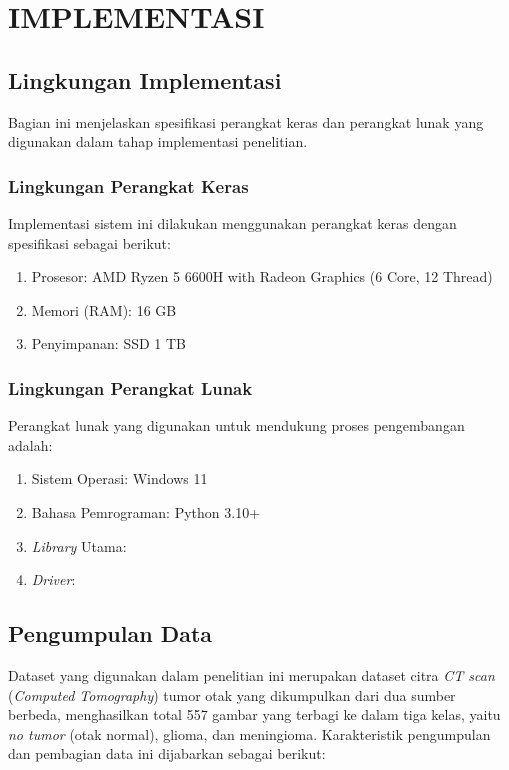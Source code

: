 \cleardoublepage
\chapter{IMPLEMENTASI}
\label{chap:implementasi}

\section{Lingkungan Implementasi}
Bagian ini menjelaskan spesifikasi perangkat keras dan perangkat lunak yang digunakan dalam tahap implementasi penelitian.

\subsection{Lingkungan Perangkat Keras}
Implementasi sistem ini dilakukan menggunakan perangkat keras dengan spesifikasi sebagai berikut:
\begin{enumerate}
	\item Prosesor: AMD Ryzen 5 6600H with Radeon Graphics (6 Core, 12 Thread)
	\item Memori (RAM): 16 GB
	\item Penyimpanan: SSD 1 TB
\end{enumerate}

\subsection{Lingkungan Perangkat Lunak}
Perangkat lunak yang digunakan untuk mendukung proses pengembangan adalah:
\begin{enumerate}
	\item Sistem Operasi: Windows 11
	\item Bahasa Pemrograman: Python 3.10+
	\item \textit{Library} Utama:
	\item \textit{Driver}: 
\end{enumerate}

\section{Pengumpulan Data}

Dataset yang digunakan dalam penelitian ini merupakan dataset citra \textit{CT scan} (\textit{Computed Tomography}) tumor otak yang dikumpulkan dari dua sumber berbeda, menghasilkan total 557 gambar yang terbagi ke dalam tiga kelas, yaitu \textit{no tumor} (otak normal), glioma, dan meningioma. Karakteristik pengumpulan dan pembagian data ini dijabarkan sebagai berikut:

